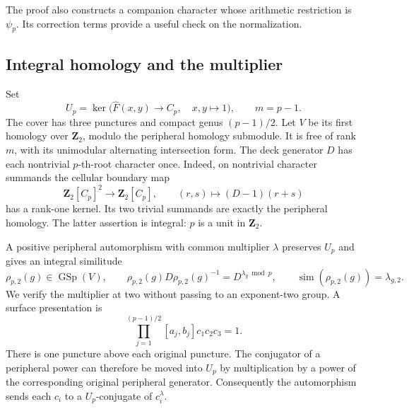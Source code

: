 The proof also constructs a companion character whose
arithmetic restriction is \(\psi_p\). Its correction
terms provide a useful check on the normalization.

\subsection{Integral homology and the multiplier}

Set
\[
 U_p=\ker\bigl(\widehat F(x,y)\longrightarrow C_p,
                         \quad x,y\longmapsto1\bigr),
 \qquad m=p-1.
\]
The cover has three punctures and compact genus
\((p-1)/2\). Let \(V\) be its first homology over
\(\mathbf Z_2\), modulo the peripheral homology submodule.
It is free of rank \(m\), with its unimodular alternating
intersection form. The deck generator \(D\) has each
nontrivial \(p\)-th-root character once.
Indeed, on nontrivial character summands the cellular
boundary map
\[
 \mathbf Z_2[C_p]^2\longrightarrow\mathbf Z_2[C_p],
          \qquad (r,s)\longmapsto(D-1)(r+s)
\]
has a rank-one kernel. Its two trivial summands are
exactly the peripheral homology. The latter assertion
is integral: \(p\) is a unit in \(\mathbf Z_2\).

A positive peripheral automorphism with common multiplier
\(\lambda\) preserves \(U_p\) and gives an integral
similitude
\begin{equation}
 \rho_{p,2}(g)\in\operatorname{GSp}(V),\qquad
 \rho_{p,2}(g)D\rho_{p,2}(g)^{-1}
       =D^{\lambda_g\bmod p},\qquad
 \operatorname{sim}(\rho_{p,2}(g))=\lambda_{g,2}.
                                                        \label{eq:coefficient-two-cross-3}
\end{equation}
We verify the multiplier at two without passing to an
exponent-two group. A surface presentation is
\begin{equation}
 \prod_{j=1}^{(p-1)/2}[a_j,b_j]c_1c_2c_3=1.
                                                        \label{eq:coefficient-two-cross-4}
\end{equation}
There is one puncture above each original puncture.
The conjugator of a peripheral power can therefore be
moved into \(U_p\) by multiplication by a power of the
corresponding original peripheral generator. Consequently
the automorphism sends each \(c_i\) to a
\(U_p\)-conjugate of \(c_i^\lambda\).

